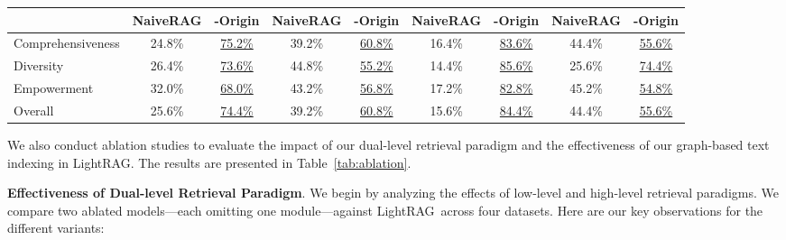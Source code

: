 \documentclass{article} %
\def\model{LightRAG}
\begin{document}
\begin{table}[t]
{\begin{tabular}{@{}lcccccccc@{}}
\cmidrule(lr){2-3} \cmidrule(lr){4-5} \cmidrule(lr){6-7} \cmidrule(lr){8-9}
                      & NaiveRAG & \textbf{-Origin} & NaiveRAG & \textbf{-Origin} & NaiveRAG & \textbf{-Origin} & NaiveRAG & \textbf{-Origin} \\
\midrule
Comprehensiveness      & 24.8\%      & \underline{75.2\%}     & 39.2\%      & \underline{60.8\%}     & 16.4\%      & \underline{83.6\%}     & 44.4\%      & \underline{55.6\%}     \\
Diversity              & 26.4\%      & \underline{73.6\%}     & 44.8\%      & \underline{55.2\%}     & 14.4\%      & \underline{85.6\%}     & 25.6\%      & \underline{74.4\%}     \\
Empowerment            & 32.0\%      & \underline{68.0\%}     & 43.2\%      & \underline{56.8\%}     & 17.2\%      & \underline{82.8\%}     & 45.2\%      & \underline{54.8\%}     \\
Overall                & 25.6\%      & \underline{74.4\%}     & 39.2\%      & \underline{60.8\%}     & 15.6\%      & \underline{84.4\%}     & 44.4\%      & \underline{55.6\%}     \\
\bottomrule
\end{tabular}
}
\end{table}

We also conduct ablation studies to evaluate the impact of our dual-level retrieval paradigm and the effectiveness of our graph-based text indexing in \model. The results are presented in Table~\ref{tab:ablation}.

\textbf{Effectiveness of Dual-level Retrieval Paradigm}.
We begin by analyzing the effects of low-level and high-level retrieval paradigms. We compare two ablated models—each omitting one module—against \model\ across four datasets. Here are our key observations for the different variants:
\end{document}

